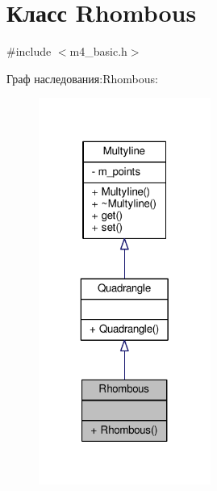 \hypertarget{class_rhombous}{\section{Класс Rhombous}
\label{class_rhombous}
}


{\ttfamily \#include $<$m4\-\_\-basic.\-h$>$}



Граф наследования\-:Rhombous\-:
\nopagebreak
\begin{figure}[H]
\begin{center}
\leavevmode
\includegraphics[width=160pt]{class_rhombous__inherit__graph}
\end{center}
\end{figure}


